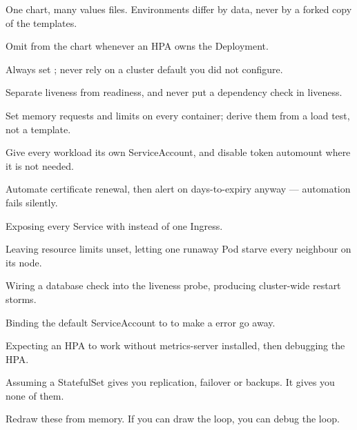 \begin{bestpractices}
\begin{wbitem}
  \item One chart, many values files. Environments differ by data, never by a forked copy of the templates.
  \item Omit  from the chart whenever an HPA owns the Deployment.
  \item Always set ; never rely on a cluster default you did not configure.
  \item Separate liveness from readiness, and never put a dependency check in liveness.
  \item Set memory requests and limits on every container; derive them from a load test, not a template.
  \item Give every workload its own ServiceAccount, and disable token automount where it is not needed.
  \item Automate certificate renewal, then alert on days-to-expiry anyway --- automation fails silently.
\end{wbitem}
\end{bestpractices}
\begin{mistakes}
\begin{wbitem}
  \item Exposing every Service with  instead of one Ingress.
  \item Leaving resource limits unset, letting one runaway Pod starve every neighbour on its node.
  \item Wiring a database check into the liveness probe, producing cluster-wide restart storms.
  \item Binding the default ServiceAccount to  to make a  error go away.
  \item Expecting an HPA to work without metrics-server installed, then debugging the HPA.
  \item Assuming a StatefulSet gives you replication, failover or backups. It gives you none of them.
\end{wbitem}
\end{mistakes}


Redraw these from memory. If you can draw the loop, you can debug the loop.

\begin{writespace}
\end{writespace}

